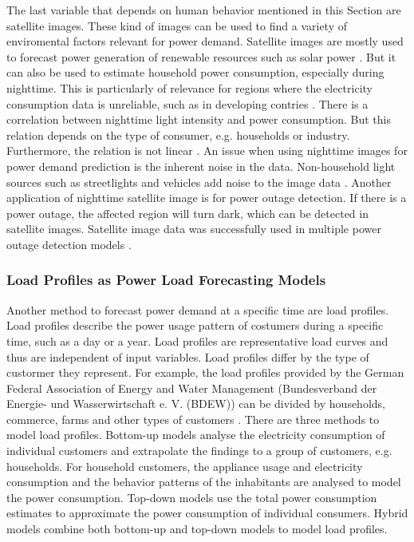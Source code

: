 The last variable that depends on human behavior mentioned in this Section are
satellite images. These kind of images can be used to find a variety 
of enviromental factors relevant for power demand.
Satellite images are mostly used to forecast power generation of 
renewable resources such as solar power \cite{solarprediction}.
But it can also be used to estimate household power consumption,
especially during nighttime. This is particularly of relevance for regions 
where the electricity consumption data is unreliable, such as in developing contries
\cite{reviewnighttime}. There is a correlation 
between nighttime light intensity and power consumption.
But this relation depends on the type of consumer, e.g. households or industry. 
Furthermore, the relation is not linear \cite{nighttimepowerestimation}. 
An issue when using nighttime images for power demand prediction is 
the inherent noise in the data. Non-household light sources such as 
streetlights and vehicles add noise to the image data \cite{reviewnighttime}.
Another application of nighttime satellite image is for power outage detection.
If there is a power outage, the affected region will turn dark, which 
can be detected in satellite images. Satellite image data 
was successfully used in multiple power outage detection models
\cite{nightpoweroutage} \cite{twitterpoweroutagelighttime}.

\subsubsection{Load Profiles as Power Load Forecasting Models}
Another method to forecast power demand at a specific time are load 
profiles. Load profiles describe the power usage pattern of costumers
during a specific time, such as a day or a year. Load profiles are 
representative load curves and thus are independent of input variables.
Load profiles differ by the type of custormer they represent. For 
example, the load profiles provided by the German Federal Association of 
Energy and Water Management (Bundesverband der Energie- und Wasserwirtschaft 
e. V. (BDEW)) can be divided by households, commerce, 
farms and other types of customers \cite{meier1999reprasentative}.
There are three methods to model load profiles.
Bottom-up models analyse the electricity consumption of individual customers
and extrapolate the findings to a group of customers, e.g. households.
For household customers, the appliance usage and electricity consumption 
and the behavior patterns of the inhabitants are analysed to model
the power consumption. Top-down models use the total power consumption 
estimates to approximate the power consumption of individual consumers.
Hybrid models combine both bottom-up and top-down models to model 
load profiles. 


